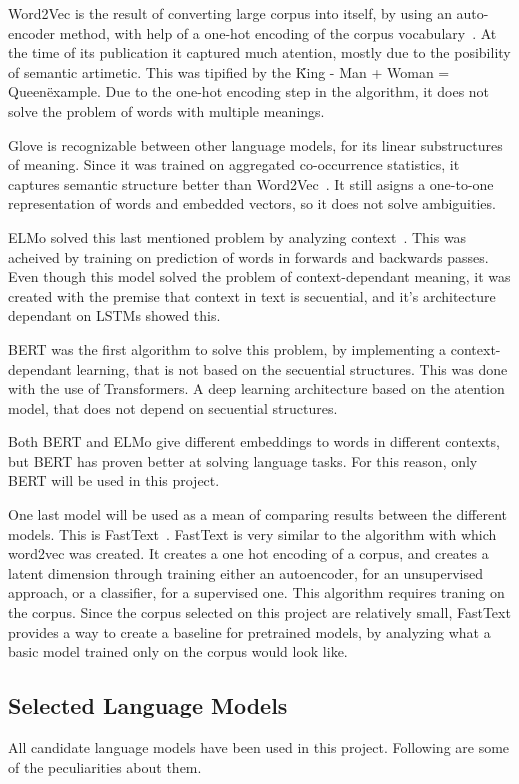 Word2Vec is the result of converting large corpus into itself, by using an auto-encoder method, with help of a one-hot encoding of the corpus vocabulary~\cite{mikolov2013word2vec}. At the time of its publication it captured much atention, mostly due to the posibility of semantic artimetic. This was tipified by the \"King - Man + Woman = Queen\" example. Due to the one-hot encoding step in the algorithm, it does not solve the problem of words with multiple meanings.

Glove is recognizable between other language models, for its linear substructures of meaning. Since it was trained on aggregated co-occurrence statistics, it captures semantic structure better than Word2Vec~\cite{penningto2014glove}. It still asigns a one-to-one representation of words and embedded vectors, so it does not solve ambiguities.

ELMo solved this last mentioned problem by analyzing context~\cite{peters2018elmo}. This was acheived by training on prediction of words in forwards and backwards passes. Even though this model solved the problem of context-dependant meaning, it was created with the premise that context in text is secuential, and it's architecture dependant on LSTMs showed this.

BERT was the first algorithm to solve this problem, by implementing a context-dependant learning, that is not based on the secuential structures. This was done with the use of Transformers. A deep learning architecture based on the atention model, that does not depend on secuential structures.

Both BERT and ELMo give different embeddings to words in different contexts, but BERT has proven better at solving language tasks. For this reason, only BERT will be used in this project.

One last model will be used as a mean of comparing results between the different models. This is FastText~\cite{joulin2017fasttext}. FastText is very similar to the algorithm with which word2vec was created. It creates a one hot encoding of a corpus, and creates a latent dimension through training either an autoencoder, for an unsupervised approach, or a classifier, for a supervised one. This algorithm requires traning on the corpus. Since the corpus selected on this project are relatively small, FastText provides a way to create a baseline for pretrained models, by analyzing what a basic model trained only on the corpus would look like.

\subsection{Selected Language Models}\label{sub:Selected Language Models}
All candidate language models have been used in this project. Following are some of the peculiarities about them.

